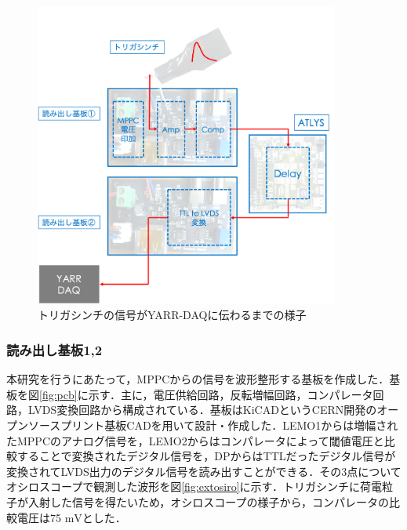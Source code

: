 \begin{figure}[h]
  \centering
  \includegraphics[width=10cm]{./figure/exttriggersignal.png}
  \caption{トリガシンチの信号がYARR-DAQに伝わるまでの様子}
  \label{fig:exttriggersignal}
\end{figure}


\subsubsection*{読み出し基板1,2}
本研究を行うにあたって，MPPCからの信号を波形整形する基板を作成した．基板を図\ref{fig:pcb}に示す．主に，電圧供給回路，反転増幅回路，コンパレータ回路，LVDS変換回路から構成されている．基板はKiCADというCERN開発のオープンソースプリント基板CADを用いて設計・作成した．LEMO1からは増幅されたMPPCのアナログ信号を，LEMO2からはコンパレータによって閾値電圧と比較することで変換されたデジタル信号を，DPからはTTLだったデジタル信号が変換されてLVDS出力のデジタル信号を読み出すことができる．その3点についてオシロスコープで観測した波形を図\ref{fig:extosiro}に示す．トリガシンチに荷電粒子が入射した信号を得たいため，オシロスコープの様子から，コンパレータの比較電圧は75 $\mathrm{mV}$とした．


